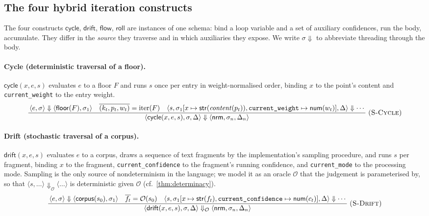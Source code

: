 \documentclass[11pt,a4paper]{article}
\theoremstyle{plain}
\theoremstyle{definition}
\theoremstyle{remark}
\newcommand{\rn}[1]{\textsc{#1}}                          %
\newcommand{\evalto}{\Downarrow}
\newcommand{\env}{\sigma}
\newcommand{\nrm}{\mathsf{nrm}}
\newcommand{\infrule}[3]{%
  \ensuremath{\displaystyle\frac{\,#2\,}{\,#3\,}}\;\rn{(#1)}}
\begin{document}
\subsection{The four hybrid iteration constructs}
\label{sec:hybrid}

The four constructs $\mathsf{cycle}$, $\mathsf{drift}$, $\mathsf{flow}$,
$\mathsf{roll}$ are instances of one schema: bind a loop variable and a set of
auxiliary confidences, run the body, accumulate. They differ in the
\emph{source} they traverse and in which auxiliaries they expose. We write
$\env\!\Downarrow$ to abbreviate threading through the body.

\paragraph{Cycle (deterministic traversal of a floor).}
$\mathsf{cycle}(x,e,s)$ evaluates $e$ to a floor $F$ and runs $s$ once per
entry in weight-normalised order, binding $x$ to the point's content and
\texttt{current\_weight} to the entry weight.
\[
\infrule{S-Cycle}{\langle e,\env\rangle\evalto\langle\mathsf{floor}(F),\env_1
                  \rangle\quad
                  \overline{(k_t,p_t,w_t)}=\mathrm{iter}(F)\quad
                  \langle s,\env_1[x\mapsto\mathsf{str}(\mathit{content}(p_t)),
                  \texttt{current\_weight}\mapsto\mathsf{num}(w_t)],\Delta\rangle
                  \evalto\cdots}
                 {\langle\mathsf{cycle}(x,e,s),\env,\Delta\rangle\evalto
                  \langle\nrm,\env_n,\Delta_n\rangle}
\]

\paragraph{Drift (stochastic traversal of a corpus).}
$\mathsf{drift}(x,e,s)$ evaluates $e$ to a corpus, draws a sequence of text
fragments by the implementation's sampling procedure, and runs $s$ per fragment,
binding $x$ to the fragment, \texttt{current\_confidence} to the fragment's
running confidence, and \texttt{current\_mode} to the processing mode. Sampling
is the only source of nondeterminism in the language; we model it as an oracle
$\mathcal{O}$ that the judgement is parameterised by, so that
$\langle s,\dots\rangle\evalto_\mathcal{O}\langle\dots\rangle$ is deterministic
given $\mathcal{O}$ (cf.\ \cref{thm:determinacy}).
\[
\infrule{S-Drift}{\langle e,\env\rangle\evalto\langle\mathsf{corpus}(s_0),\env_1
                  \rangle\quad \overline{f_t}=\mathcal{O}(s_0)\quad
                  \langle s,\env_1[x\mapsto\mathsf{str}(f_t),
                  \texttt{current\_confidence}\mapsto\mathsf{num}(c_t)],\Delta
                  \rangle\evalto\cdots}
                 {\langle\mathsf{drift}(x,e,s),\env,\Delta\rangle\evalto_
                  \mathcal{O}\langle\nrm,\env_n,\Delta_n\rangle}
\]
\end{document}
